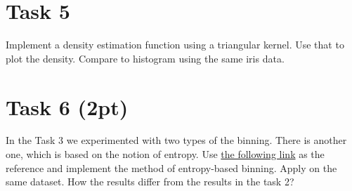 \documentclass{article}
\begin{document}
\section*{Task 5}
Implement a density estimation function using a triangular kernel. Use that to plot the density. Compare to histogram using the same iris data. 

\section*{Task 6 (2pt)}
In the Task 3 we experimented with two types of the binning. There is another one, which is based on the notion of entropy. Use  \href{http://www.saedsayad.com/supervised_binning.htm}{the following link} as the reference and implement the method of entropy-based binning. Apply on the same dataset. How the results differ from the results in the task 2?
\end{document}
